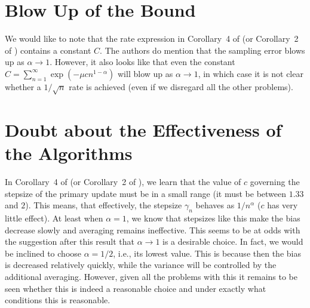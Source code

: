 \documentclass{article}
\begin{document}
\section{Blow Up of the Bound}
We would like to note that the rate expression in Corollary~4 of \cite{flstda} (or Corollary~2 of \cite{flstd}) contains a constant $C$. The authors do mention that the sampling error blows up as $\alpha \rightarrow 1$.
However, it also looks like that even the constant $C=\sum_{n=1}^\infty \exp(-\mu cn^{1-\alpha})$ will blow up as $\alpha\rightarrow 1$, in which case it is not clear whether a $1/\sqrt{n}$ rate is achieved (even if we disregard all the other problems).

\section{Doubt about the Effectiveness of the Algorithms}
In Corollary~4 of \cite{flstda} (or Corollary~2 of \cite{flstd}), we learn that the value of $c$ governing the stepsize of the primary update must be in a small range (it must be between $1.33$ and $2$). This means, that effectively, the stepsize $\gamma_n$ behaves as $1/n^\alpha$ ($c$ has very little effect). At least when $\alpha=1$, we know that stepsizes like this make the bias decrease slowly and averaging remains ineffective. This seems to be at odds with the suggestion after this result that $\alpha\to 1$ is a desirable choice. In fact, we would be inclined to choose $\alpha=1/2$, i.e., its lowest value. This is because then the bias is decreased relatively quickly, while the variance will be controlled by the additional averaging. However, given all the problems with this it remains to be seen whether this is indeed a reasonable choice and under exactly what conditions this is reasonable.


%




\end{document}
